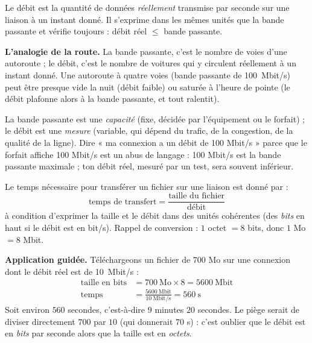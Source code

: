 \documentclass[11pt]{article}
\newcommand{\cle}[1]{{\popxbold\color{popdark}#1}}
\begin{document}
\begin{definition}[Débit]
Le \cle{débit} est la quantité de données \emph{réellement} transmise par seconde sur une liaison à un instant donné. Il s'exprime dans les mêmes unités que la bande passante et vérifie toujours : débit réel $\leq$ bande passante.
\end{definition}

\textbf{L'analogie de la route.} La bande passante, c'est le nombre de voies d'une autoroute ; le débit, c'est le nombre de voitures qui y circulent réellement à un instant donné. Une autoroute à quatre voies (bande passante de \SI{100}{Mbit/s}) peut être presque vide la nuit (débit faible) ou saturée à l'heure de pointe (le débit plafonne alors à la bande passante, et tout ralentit).

\begin{attention}
La bande passante est une \emph{capacité} (fixe, décidée par l'équipement ou le forfait) ; le débit est une \emph{mesure} (variable, qui dépend du trafic, de la congestion, de la qualité de la ligne). Dire « ma connexion a un débit de 100 Mbit/s » parce que le forfait affiche 100 Mbit/s est un abus de langage : 100 Mbit/s est la bande passante maximale ; ton débit réel, mesuré par un test, sera souvent inférieur.
\end{attention}

\begin{propriete}
Le temps nécessaire pour transférer un fichier sur une liaison est donné par :
\[
\text{temps de transfert} = \frac{\text{taille du fichier}}{\text{débit}}
\]
à condition d'exprimer la taille et le débit dans des unités cohérentes (des \emph{bits} en haut si le débit est en bit/s). Rappel de conversion : $1$ octet $= 8$ bits, donc $1$ Mo $= 8$ Mbit.
\end{propriete}

\textbf{Application guidée.} Téléchargeons un fichier de $700$ Mo sur une connexion dont le débit réel est de \SI{10}{Mbit/s} :
\begin{align*}
\text{taille en bits} &= 700 \ \text{Mo} \times 8 = 5600 \ \text{Mbit} \\
\text{temps} &= \frac{5600 \ \text{Mbit}}{10 \ \text{Mbit/s}} = 560 \ \text{s}
\end{align*}
Soit environ $560$ secondes, c'est-à-dire $9$ minutes $20$ secondes. Le piège serait de diviser directement $700$ par $10$ (qui donnerait $70$ s) : c'est oublier que le débit est en \emph{bits} par seconde alors que la taille est en \emph{octets}.
\end{document}
